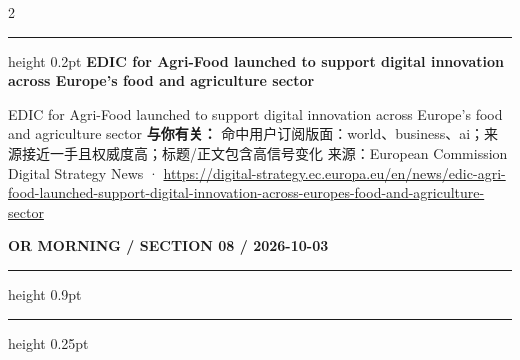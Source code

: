 \documentclass[10.5pt]{ctexart}
\begin{document}
\begin{multicols}{2}
\vspace{2mm}
\hrule height 0.2pt
\vspace{2mm}
{\large\bfseries EDIC for Agri-Food launched to support digital innovation across Europe’s food and agriculture sector}\par
EDIC for Agri-Food launched to support digital innovation across Europe’s food and agriculture sector
\textbf{与你有关：} 命中用户订阅版面：world、business、ai；来源接近一手且权威度高；标题/正文包含高信号变化
{\footnotesize\color{ormuted} 来源：European Commission Digital Strategy News · \url{https://digital-strategy.ec.europa.eu/en/news/edic-agri-food-launched-support-digital-innovation-across-europes-food-and-agriculture-sector}}
\end{multicols}
\newpage
{\small\bfseries OR MORNING / SECTION 08 / 2026-10-03}
\vspace{2mm}
\hrule height 0.9pt
\vspace{1.5mm}
\hrule height 0.25pt
\vspace{4mm}
\end{document}
